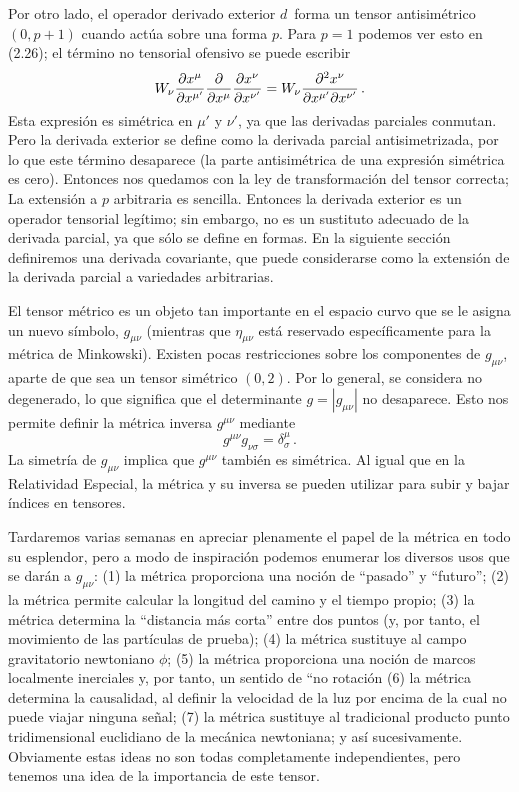 \documentclass[11pt,b5paper,openany,twoside]{book}
\newcommand{\mn}{{\mu\nu}}
\begin{document}
Por otro lado, el operador derivado exterior $ d\,$ forma un tensor antisimétrico $(0,p+1)$ cuando actúa sobre una forma $p$.
Para $p=1$ podemos ver esto en (2.26); el término no tensorial ofensivo se puede escribir
\begin{equation}
W_\nu{{\partial x^{\mu}}\over{\partial x^{\mu'}}}
{{\partial}\over{\partial x^\mu}}
{{\partial x^{\nu}}\over{\partial x^{\nu'}}} =
W_\nu{{\partial^2 x^{\nu}}\over{\partial x^{\mu'}
\partial x^{\nu'}}}\,.\label{2.27}
\end{equation}
Esta expresión es simétrica en $\mu'$ y $\nu'$, ya que las derivadas parciales conmutan.
Pero la derivada exterior se define como la derivada parcial antisimetrizada, por lo que este término desaparece (la parte antisimétrica de una expresión simétrica es cero).
Entonces nos quedamos con la ley de transformación del tensor correcta; La extensión a $p$ arbitraria es sencilla.
Entonces la derivada exterior es un operador tensorial legítimo; sin embargo, no es un sustituto adecuado de la derivada parcial, ya que sólo se define en formas.
En la siguiente sección definiremos una derivada covariante, que puede considerarse como la extensión de la derivada parcial a variedades arbitrarias.

El tensor métrico es un objeto tan importante en el espacio curvo que se le asigna un nuevo símbolo, $g_\mn$ (mientras que $\eta_\mn$ está reservado específicamente para la métrica de Minkowski).
Existen pocas restricciones sobre los componentes de $g_\mn$, aparte de que sea un tensor simétrico $(0,2)$.
Por lo general, se considera no degenerado, lo que significa que el determinante $g=|g_\mn|$ no desaparece.
Esto nos permite definir la métrica inversa $g^\mn$ mediante
\begin{equation}
g^\mn g_{\nu\sigma} = \delta^\mu_\sigma\,.\label{2.28}
\end{equation}
La simetría de $g_\mn$ implica que $g^\mn$ también es simétrica.
Al igual que en la Relatividad Especial, la métrica y su inversa se pueden utilizar para subir y bajar índices en tensores.

Tardaremos varias semanas en apreciar plenamente el papel de la métrica en todo su esplendor, pero a modo de inspiración podemos enumerar los diversos usos que se darán a $g_\mn$: (1) la métrica proporciona una noción de ``pasado'' y ``futuro''; (2) la métrica permite calcular la longitud del camino y el tiempo propio; (3) la métrica determina la ``distancia más corta'' entre dos puntos (y, por tanto, el movimiento de las partículas de prueba); (4) la métrica sustituye al campo gravitatorio newtoniano $\phi$; (5) la métrica proporciona una noción de marcos localmente inerciales y, por tanto, un sentido de ``no rotación (6) la métrica determina la causalidad, al definir la velocidad de la luz por encima de la cual no puede viajar ninguna señal; (7) la métrica sustituye al tradicional producto punto tridimensional euclidiano de la mecánica newtoniana; y así sucesivamente.
Obviamente estas ideas no son todas completamente independientes, pero tenemos una idea de la importancia de este tensor.
\end{document}
